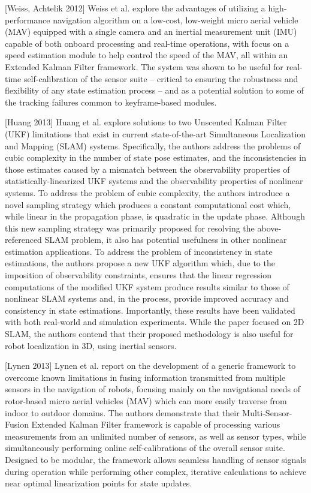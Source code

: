 [Weiss, Achtelik 2012] Weiss et al. explore the advantages of utilizing a high-performance navigation algorithm on a low-cost, low-weight micro aerial vehicle (MAV) equipped with a single camera and an inertial measurement unit (IMU) capable of both onboard processing and real-time operations, with focus on a speed estimation module to help control the speed of the MAV, all within an Extended Kalman Filter framework. The system was shown to be useful for real-time self-calibration of the sensor suite – critical to ensuring the robustness and flexibility of any state estimation process – and as a potential solution to some of the tracking failures common to keyframe-based modules. 

[Huang 2013] Huang et al. explore solutions to two Unscented Kalman Filter (UKF) limitations that exist in current state-of-the-art Simultaneous Localization and Mapping (SLAM) systems. Specifically, the authors address the problems of cubic complexity in the number of state pose estimates, and the inconsistencies in those estimates caused by a mismatch between the observability properties of statistically-linearized UKF systems and the observability properties of nonlinear systems. To address the problem of cubic complexity, the authors introduce a novel sampling strategy which produces a constant computational cost which, while linear in the propagation phase, is quadratic in the update phase. Although this new sampling strategy was primarily proposed for resolving the above-referenced SLAM problem, it also has potential usefulness in other nonlinear estimation applications. To address the problem of inconsistency in state estimations, the authors propose a new UKF algorithm which, due to the imposition of observability constraints, ensures that the linear regression computations of the modified UKF system produce results similar to those of nonlinear SLAM systems and, in the process, provide improved accuracy and consistency in state estimations. Importantly, these results have been validated with both real-world and simulation experiments. While the paper focused on 2D SLAM, the authors contend that their proposed methodology is also useful for robot localization in 3D, using inertial sensors.

[Lynen 2013] Lynen et al. report on the development of a generic framework to overcome known limitations in fusing information transmitted from multiple sensors in the navigation of robots, focusing mainly on the navigational needs of rotor-based micro aerial vehicles (MAV) which can more easily traverse from indoor to outdoor domains. The authors demonstrate that their Multi-Sensor-Fusion Extended Kalman Filter framework is capable of processing various measurements from an unlimited number of sensors, as well as sensor types, while simultaneously performing online self-calibrations of the overall sensor suite. Designed to be modular, the framework allows seamless handling of sensor signals during operation while performing other complex, iterative calculations to achieve near optimal linearization points for state updates. 


